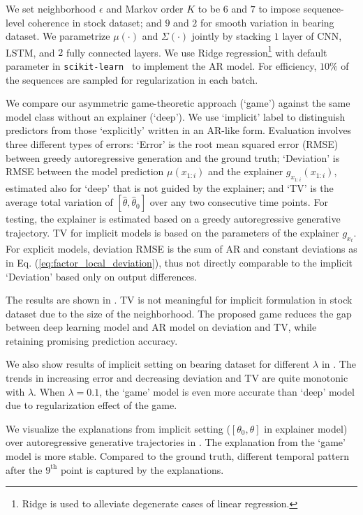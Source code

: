 We set neighborhood $\epsilon$ and Markov order $K$ to be $6$ and $7$ to impose sequence-level coherence in stock dataset; and $9$ and $2$ for smooth variation in bearing dataset.
We parametrize $\mu(\cdot)$ and $\Sigma(\cdot)$ jointly by stacking $1$ layer of CNN, LSTM, and $2$ fully connected layers. %
We use Ridge regression\footnote{Ridge is used to alleviate degenerate cases of linear regression.} with default parameter in \texttt{scikit-learn}~\cite{scikit-learn} to implement the AR model. For efficiency, $10\%$ of the sequences are sampled for regularization in each batch.


We compare our asymmetric game-theoretic approach (`game') against the same model class without an explainer (`deep'). We use `implicit' label to distinguish predictors from those `explicitly' written in an AR-like form. Evaluation involves three different types of errors: `Error' is the root mean squared error (RMSE) between greedy autoregressive generation and the ground truth; `Deviation' is RMSE between the model prediction $\mu(x_{1:i})$ and the explainer $g_{x_{1:i}}(x_{1:i})$, estimated also for `deep' that is not guided by the explainer; and `TV' is the average total variation of $[\hat{\theta}, \hat{\theta}_0]$ over any two consecutive time points. For testing, the explainer is estimated based on a greedy autoregressive generative trajectory. TV for implicit models is based on the parameters of the explainer $g_{x_t}$. For explicit models, deviation RMSE is the sum of AR and constant deviations as in Eq. (\ref{eq:factor_local_deviation}), thus not directly comparable to the implicit `Deviation' based only on output differences.

The results are shown in .
TV is not meaningful for implicit formulation in stock dataset due to the size of the neighborhood.
The proposed game reduces the gap between deep learning model and AR model on deviation and TV, while retaining promising prediction accuracy.

We also show results of implicit setting on bearing dataset for different $\lambda$ in . The trends in increasing error and decreasing deviation and TV are quite monotonic with $\lambda$. When $\lambda = 0.1$, the `game' model is even more accurate than `deep' model due to regularization effect of the game.

We visualize the explanations from implicit setting ($[\theta_0, \theta]$ in explainer model) over autoregressive generative trajectories in . The explanation from the `game' model is more stable. 
Compared to the ground truth, different temporal pattern after the $9^\text{th}$ point is captured by the explanations.
